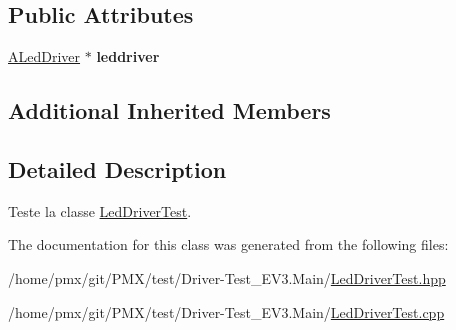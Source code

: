 \subsection*{Public Attributes}
\begin{DoxyCompactItemize}
\item 
\mbox{\label{classtest_1_1LedDriverTest_afa2ff1a73ab8245606f87ba2b6fdc55a}} 
\hyperlink{classALedDriver}{A\+Led\+Driver} $\ast$ {\bfseries leddriver}
\end{DoxyCompactItemize}
\subsection*{Additional Inherited Members}


\subsection{Detailed Description}
Teste la classe \hyperlink{classtest_1_1LedDriverTest}{Led\+Driver\+Test}. 

The documentation for this class was generated from the following files\+:\begin{DoxyCompactItemize}
\item 
/home/pmx/git/\+P\+M\+X/test/\+Driver-\/\+Test\+\_\+\+E\+V3.\+Main/\hyperlink{Driver-Test__EV3_8Main_2LedDriverTest_8hpp}{Led\+Driver\+Test.\+hpp}\item 
/home/pmx/git/\+P\+M\+X/test/\+Driver-\/\+Test\+\_\+\+E\+V3.\+Main/\hyperlink{Driver-Test__EV3_8Main_2LedDriverTest_8cpp}{Led\+Driver\+Test.\+cpp}\end{DoxyCompactItemize}
